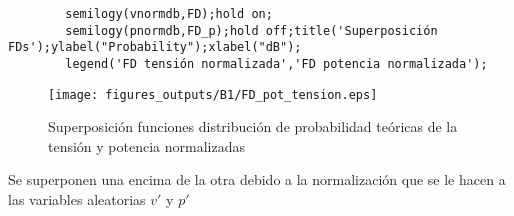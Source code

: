\documentclass{article}
\begin{document}
    \begin{lstlisting}
        semilogy(vnormdb,FD);hold on;
        semilogy(pnormdb,FD_p);hold off;title('Superposición FDs');ylabel("Probability");xlabel("dB");
        legend('FD tensión normalizada','FD potencia normalizada'); 
    \end{lstlisting}
    \begin{figure}[h]
        \centering
        \texttt{[image: figures\_outputs/B1/FD\_pot\_tension.eps]}
        \caption{Superposición funciones distribución de probabilidad teóricas de la tensión y potencia normalizadas}
        \label{fig:my_label}
    \end{figure}      
    \par Se superponen una encima de la otra debido a la normalización que se le hacen a las variables aleatorias  \( v' \) y \( p' \)
    \par 
\end{document}

